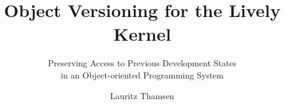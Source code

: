 \documentclass[draft,master]{swathesis}
\author{Lauritz Thamsen}
\title{Object Versioning for the Lively Kernel}
\subtitle{Preserving Access to Previous Development States\\ in an Object-oriented Programming System}
\begin{document}
\frontmatter
\maketitle

% 
\tableofcontents
\listoffigures
\mainmatter












\printbibliography
\clearpage
% 
\backmatter
\markboth{}\relax
{}
\end{document}
